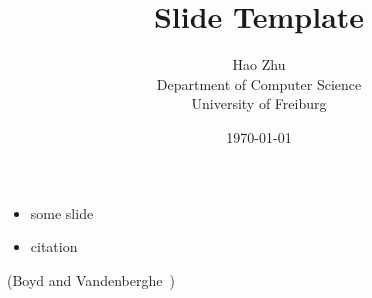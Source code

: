 \documentclass[landscape]{foils}
\title{Slide Template}
\author{
    Hao Zhu\\[10pt]
    Department of Computer Science\\
    University of Freiburg
}
\date{\today}
\begin{document}
\maketitle

\vfs
\begin{itemize}\itemsep=20pt
    \item some slide
    \item citation
\end{itemize}
\vfs

\lipsum[1]

(Boyd and Vandenberghe~\cite{boyd2004convex})

\end{document}
